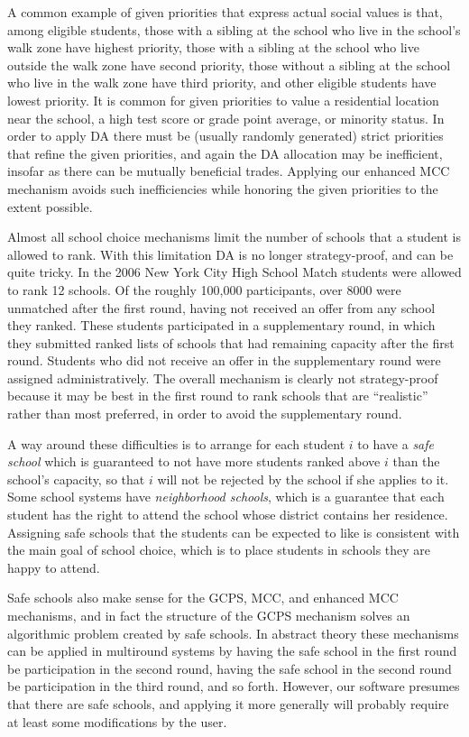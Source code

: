 \documentclass[12pt]{article}
\theoremstyle{definition}
\begin{document}
A common example of given priorities that express actual social values
is that, among eligible students, those with a sibling at the school
who live in the school's walk zone have highest priority, those with a
sibling at the school who live outside the walk zone have second
priority, those without a sibling at the school who live in the walk
zone have third priority, and other eligible students have lowest
priority.  It is common for given priorities to value a residential
location near the school, a high test score or grade point average, or
minority status.  In order to apply DA there must be (usually randomly
generated) strict priorities that refine the given priorities, and
again the DA allocation may be inefficient, insofar as there can be
mutually beneficial trades.  Applying our enhanced MCC mechanism
avoids such inefficiencies while honoring the given priorities to the
extent possible.

Almost all school choice mechanisms limit the number of schools that a
student is allowed to rank.  With this limitation DA is no longer
strategy-proof, and can be quite tricky.  In the 2006 New York City
High School Match students were allowed to rank 12 schools.  Of the
roughly 100,000 participants, over 8000 were unmatched after the first
round, having not received an offer from any school they ranked.
These students participated in a supplementary round, in which they
submitted ranked lists of schools that had remaining capacity after
the first round.  Students who did not receive an offer in the
supplementary round were assigned administratively.  The overall
mechanism is clearly not strategy-proof because it may be best in the
first round to rank schools that are ``realistic'' rather than most
preferred, in order to avoid the supplementary round.

A way around these difficulties is to arrange for each student $i$ to
have a \emph{safe school} which is guaranteed to not have more
students ranked above $i$ than the school's capacity, so that $i$ will
not be rejected by the school if she applies to it.  Some school
systems have \emph{neighborhood schools}, which is a guarantee that
each student has the right to attend the school whose district
contains her residence.  Assigning safe schools that the students can
be expected to like is consistent with the main goal of school choice,
which is to place students in schools they are happy to attend.

Safe schools also make sense for the GCPS, MCC, and enhanced MCC
mechanisms, and in fact the structure of the GCPS mechanism solves an
algorithmic problem created by safe schools.  In abstract theory these
mechanisms can be applied in multiround systems by having the safe
school in the first round be participation in the second round, having
the safe school in the second round be participation in the third
round, and so forth. However, our software presumes that there are
safe schools, and applying it more generally will probably require
at least some modifications by the user.
\end{document}
